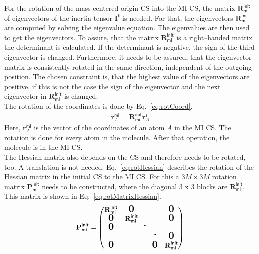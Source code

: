 	For the rotation of the mass centered origin CS into the MI CS,
	the matrix $\textbf{R}_\mathsf{mi}^\mathsf{init}$ of eigenvectors of the inertia tensor $\textbf{I}^\mathsf{s}$ is needed.
	For that, the eigenvectors $\textbf{R}_\mathsf{mi}^\mathsf{init}$ are computed
	by solving the eigenvalue equation.
	The eigenvalues are then used to get the eigenvectors.
	To assure, that the matrix $\textbf{R}_\mathsf{mi}^\mathsf{init}$ is a right--handed matrix the determinant is calculated.
	If the determinant is negative, the sign of the third eigenvector is changed. Furthermore, it needs to be assured,
	that the eigenvector matrix is consistently rotated in the same direction, independent of the outgoing position.
	The chosen constraint is, that the highest value of the eigenvectors are positive,
	if this is not the case the sign of the eigenvector and the next eigenvector in $\textbf{R}_\mathsf{mi}^\mathsf{init}$ is changed.\\
	The rotation of the coordinates is done by Eq.~\eqref{eq:rotCoord}.
	\begin{align}
		\textbf{r}_A^\mathsf{mi} = \textbf{R}_\mathsf{mi}^\mathsf{init} \textbf{r}_A^\mathsf{s}
		\label{eq:rotCoord}
	\end{align}
	Here, $\textbf{r}_A^\mathsf{mi}$ is the vector of the coordinates of an atom $A$ in the MI CS.
	The rotation is done for every atom in the molecule. After that operation,
	the molecule is in the MI CS.\\ 
	\newpage
	The Hessian matrix also depends on the CS and therefore needs to be rotated, too.
	A translation is not needed. Eq.~\eqref{eq:rotHessian} describes
	the rotation of the Hessian matrix in the initial CS to the MI CS.
	For this a $3M \times 3M$ rotation matrix $\textbf{P}_\mathsf{mi}^\mathsf{init}$ needs to be constructed,
	where the diagonal 3 x 3 blocks are $\textbf{R}_\mathsf{mi}^\mathsf{init}$.
	This matrix is shown in Eq.~\eqref{eq:rotMatrixHessian}.
	\begin{align}
		\label{eq:rotMatrixHessian}
		\textbf{P}_\mathsf{mi}^\mathsf{init} = \left(\begin{matrix}
							\textbf{R}_\mathsf{mi}^\mathsf{init} &\text{\Large\textbf{0}}& && \text{\Large\textbf{0}}  \\
							\text{\Large\textbf{0}}& \textbf{R}_\mathsf{mi}^\mathsf{init} & & &\text{\Large\textbf{0}} \\
							\text{\Large\textbf{0}} & & \ddot& &\\
							 & & &\ddot & \text{\Large\textbf{0}}\\
							\text{\Large\textbf{0}}& & & \text{\Large\textbf{0}} &\textbf{R}_\mathsf{mi}^\mathsf{init}
							\end{matrix}\right)
	\end{align}

